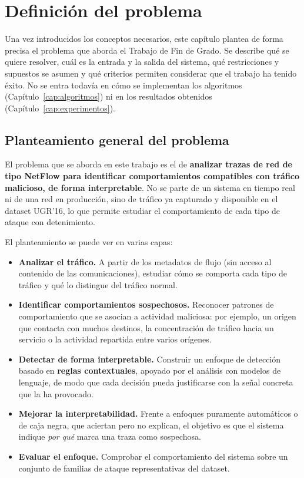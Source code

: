 \chapter{Definición del problema}
\label{cap:problema}

Una vez introducidos los conceptos necesarios, este capítulo plantea de forma precisa el problema que aborda el Trabajo de Fin de Grado. Se describe qué se quiere resolver, cuál es la entrada y la salida del sistema, qué restricciones y supuestos se asumen y qué criterios permiten considerar que el trabajo ha tenido éxito. No se entra todavía en cómo se implementan los algoritmos (Capítulo~\ref{cap:algoritmos}) ni en los resultados obtenidos (Capítulo~\ref{cap:experimentos}).

\section{Planteamiento general del problema}
\label{sec:prob_planteamiento}

El problema que se aborda en este trabajo es el de \textbf{analizar trazas de red de tipo NetFlow para identificar comportamientos compatibles con tráfico malicioso, de forma interpretable}. No se parte de un sistema en tiempo real ni de una red en producción, sino de tráfico ya capturado y disponible en el dataset UGR'16, lo que permite estudiar el comportamiento de cada tipo de ataque con detenimiento.

El planteamiento se puede ver en varias capas:

\begin{itemize}
  \item \textbf{Analizar el tráfico.} A partir de los metadatos de flujo (sin acceso al contenido de las comunicaciones), estudiar cómo se comporta cada tipo de tráfico y qué lo distingue del tráfico normal.
  \item \textbf{Identificar comportamientos sospechosos.} Reconocer patrones de comportamiento que se asocian a actividad maliciosa: por ejemplo, un origen que contacta con muchos destinos, la concentración de tráfico hacia un servicio o la actividad repartida entre varios orígenes.
  \item \textbf{Detectar de forma interpretable.} Construir un enfoque de detección basado en \textbf{reglas contextuales}, apoyado por el análisis con modelos de lenguaje, de modo que cada decisión pueda justificarse con la señal concreta que la ha provocado.
  \item \textbf{Mejorar la interpretabilidad.} Frente a enfoques puramente automáticos o de caja negra, que aciertan pero no explican, el objetivo es que el sistema indique \emph{por qué} marca una traza como sospechosa.
  \item \textbf{Evaluar el enfoque.} Comprobar el comportamiento del sistema sobre un conjunto de familias de ataque representativas del dataset.
\end{itemize}

